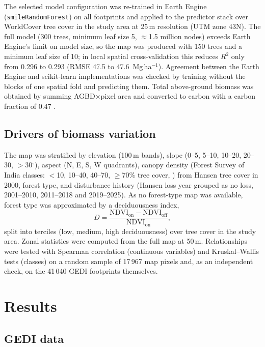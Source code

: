 \documentclass[11pt,a4paper]{article}
\newcommand{\mgha}{Mg\,ha$^{-1}$}
\newcommand{\rsq}{$R^2$}
\begin{document}
The selected model configuration was re-trained in Earth Engine
(\texttt{smileRandomForest}) on all footprints and applied to the predictor stack over
WorldCover tree cover in the study area at 25\,m resolution (UTM zone 43N). The full model
(300 trees, minimum leaf size 5, $\approx$1.5 million nodes) exceeds Earth Engine's limit on
model size, so the map was produced with 150 trees and a minimum leaf size of 10; in local
spatial cross-validation this reduces \rsq{} only from 0.296 to 0.293 (RMSE 47.5 to
47.6~\mgha{}). Agreement between the Earth Engine and scikit-learn implementations was checked
by training without the blocks of one spatial fold and predicting them. Total above-ground
biomass was obtained by summing AGBD$\times$pixel area and converted to carbon with a carbon
fraction of 0.47 \citep{ipcc2006}.

\subsection{Drivers of biomass variation}

The map was stratified by elevation (100\,m bands), slope (0--5, 5--10, 10--20, 20--30,
$>$30$^\circ$), aspect (N, E, S, W quadrants), canopy density (Forest Survey of India classes:
$<$10, 10--40, 40--70, $\geq$70\% tree cover, \citealp{fsi2021}) from Hansen tree cover in
2000, forest type, and disturbance history (Hansen loss year grouped as no loss, 2001--2010,
2011--2018 and 2019--2025). As no forest-type map was available, forest type was approximated
by a deciduousness index,
\begin{equation}
  D = \frac{\mathrm{NDVI}_{\text{on}} - \mathrm{NDVI}_{\text{off}}}{\mathrm{NDVI}_{\text{on}}},
\end{equation}
split into terciles (low, medium, high deciduousness) over tree cover in the study area. Zonal
statistics were computed from the full map at 50\,m. Relationships were tested with Spearman
correlation (continuous variables) and Kruskal--Wallis tests (classes) on a random sample of
17\,967 map pixels and, as an independent check, on the 41\,040 GEDI footprints themselves.

\section{Results}

\subsection{GEDI data}
\end{document}
